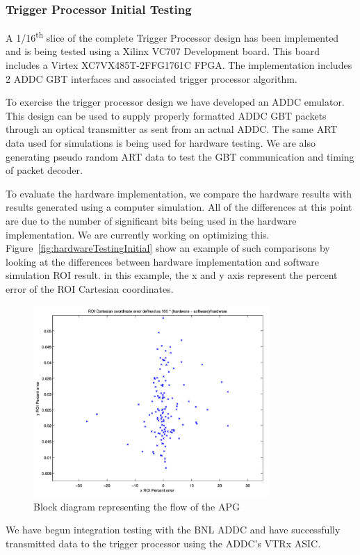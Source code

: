 \subsubsection{Trigger Processor Initial Testing}

A 1/16\textsuperscript{th} slice of the complete Trigger Processor
design has been implemented and is being tested using a Xilinx VC707
Development board. This board includes a Virtex XC7VX485T-2FFG1761C
FPGA. The implementation includes 2 ADDC GBT interfaces and associated
trigger processor algorithm. 

To exercise the trigger processor design we have developed an ADDC
emulator. This design can be used to supply properly formatted ADDC
GBT packets through an optical transmitter as sent from an actual
ADDC. The same ART data used for simulations is being used for hardware
testing. We are also generating pseudo random ART data to test the
GBT communication and timing of packet decoder.

To evaluate the hardware implementation, we compare the hardware results
with results generated using a computer simulation. All of the differences
at this point are due to the number of significant bits being used
in the hardware implementation. We are currently working on optimizing
this. Figure~\ref{fig:hardwareTestingInitial} show an example of such comparisons by looking at the
differences between hardware implementation and software simulation
ROI result. in this example, the x and y axis represent the percent
error of the ROI Cartesian coordinates.

\begin{figure}[h]
 \begin{center}
 \includegraphics[width=0.8\textwidth]{figures/hardwareTestingInitial}
 \caption{Block diagram representing the flow of the APG}
 \label{fig:APGBlockDiag}
 \end{center}
 \end{figure}

We have begun integration testing with the BNL ADDC and have successfully
transmitted data to the trigger processor using the ADDC's VTRx ASIC.

